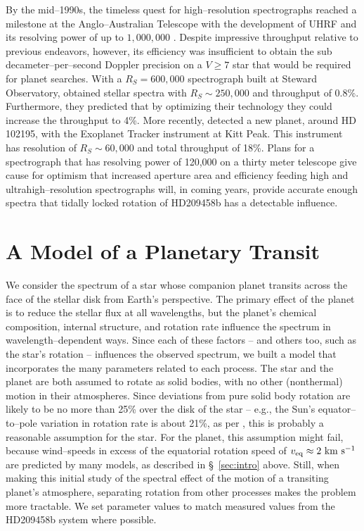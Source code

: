 \documentclass[12pt,preprint]{aastex}
\begin{document}
By the mid--1990s, the timeless quest for high--resolution spectrographs
reached a milestone at the Anglo--Australian Telescope with the development
of UHRF and its resolving power of up to $1,000,000$ \citep{diego_et_al1995}.
Despite impressive throughput relative to previous endeavors, however, its
efficiency was insufficient to obtain the sub decameter--per--second Doppler
precision on a $V \ge 7$ star that would be required for planet
searches.  With a $R_S = 600,000$ spectrograph built at Steward Observatory,
\citet{ge_et_al2002} obtained stellar spectra with $R_S \sim 250,000$ and
throughput of 0.8\%.  Furthermore, they predicted that by optimizing their
technology they could increase the throughput to 4\%.  More recently,
\citet{ge_et_al2006} detected a new planet, around HD 102195, with the
Exoplanet Tracker instrument at Kitt Peak.  This instrument has resolution
of $R_S \sim 60,000$ and total throughput of 18\%.
Plans for a spectrograph that has resolving power of 120,000 on a
thirty meter telescope \citep{tokunaga_et_al2006} give cause for optimism
that increased aperture area and efficiency feeding high and
ultrahigh--resolution spectrographs will, in coming years, provide accurate
enough spectra that tidally locked rotation of HD209458b has a detectable
influence.



\section{A Model of a Planetary Transit}
\label{sec:model}
We consider the spectrum of a star whose companion planet transits across the
face of the stellar disk from Earth's perspective.  The primary effect of the
planet is to reduce the stellar flux at all wavelengths, but the planet's
chemical composition, internal structure, and rotation rate influence
the spectrum in wavelength--dependent ways.  Since each
of these factors -- and others too, such as the star's rotation --
influences the observed spectrum, we built a model that incorporates
the many parameters related to each process.
The star and the planet are both assumed to rotate as solid bodies, with no
other (nonthermal) motion in their atmospheres.  Since deviations from
pure solid body rotation are likely to be no more than 25\% over the disk of
the star -- e.g., the Sun's equator--to--pole variation in rotation rate
is about 21\%, as per \citet{howard_et_al1984}, this is probably a reasonable
assumption for the star.  For the planet, this assumption might fail,
because wind--speeds in excess of the equatorial rotation speed of
$v_{\rm eq} \approx 2 {\rm ~km~s^{-1}}$ are predicted by many models, as
described in \S~\ref{sec:intro} above.  Still, when making this initial study
of the spectral effect of the motion of a transiting planet's atmosphere,
separating rotation from other processes makes the problem more tractable.
We set parameter values to match measured values from the HD209458b system
where possible.
\end{document}
